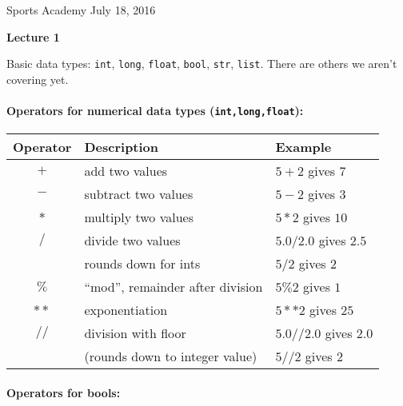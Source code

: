 \documentclass[11pt]{article}
\newlength{\toppush}
\newcommand{\htitle}[2]{\noindent\vspace*{-\toppush}\newline\parbox{6.5in}
 {\large Sports Academy \hfill #1\newline
\hspace*{\fill}{\bf Algorithms and Programming for High Schoolers} \hspace*{\fill} \newline
\mbox{}\hrulefill\mbox{}}\vspace*{1ex}\mbox{}\newline
\begin{center}{\Large\bf #2}\end{center}}
\begin{document}
\htitle{July 18, 2016}{Lecture 1}

Basic data types: \texttt{int}, \texttt{long}, \texttt{float},
\texttt{bool},
\texttt{str}, \texttt{list}. There are others 
we aren't covering yet.

\bigskip

\paragraph{Operators for numerical data types (\texttt{int,long,float}):}

\begin{center}

\begin{tabular}{|c|l|l|}
\hline
Operator & Description & Example\\
\hline
$+$ & add two values & $5+2$ gives $7$\\
\hline
$-$ & subtract two values & $5-2$ gives $3$\\
\hline
$*$ & multiply two values & $5*2$ gives $10$\\
\hline
$/$ & divide two values& $5.0/2.0$ gives $2.5$\\
& rounds down for ints & $5/2$ gives $2$\\
\hline
$\%$ & ``mod'', remainder after division& $5\% 2$ gives $1$\\
\hline
$**$ & exponentiation & $5**2$ gives $25$\\
\hline
$//$ & division with floor& $5.0//2.0$ gives $2.0$\\
& (rounds down to integer value) & $5//2$ gives $2$\\
\hline
\end{tabular}
\end{center}

\paragraph{Operators for bools:}
\end{document}
